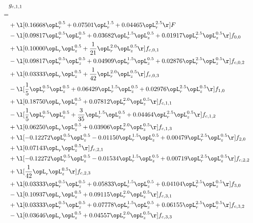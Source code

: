 \begin{alignat}{2} 
\label{eq:g_11_0} 
& g_{c,1,1} \nonumber \\ 
 = \\ 
& + \l[  0.16668 \opL_r^{0.5} +  0.07501 \opL_r^{1.5} +  0.04465 \opL_r^{2.5}  \r] F \nonumber \\ 
& - \l[  0.09817 \opL_r^{0.5} \opL_z^{0.5} +  0.03682 \opL_r^{1.5} \opL_z^{0.5} +  0.01917 \opL_r^{2.5} \opL_z^{0.5}  \r] f_{0,0} \nonumber \\ 
& + \l[  0.10000 \opL_r \opL_z^{0.5} + \frac{1}{21} \opL_r^{2.0} \opL_z^{0.5}  \r] f_{c,0,1} \nonumber \\ 
& - \l[  0.09817 \opL_r^{0.5} \opL_z^{0.5} +  0.04909 \opL_r^{1.5} \opL_z^{0.5} +  0.02876 \opL_r^{2.5} \opL_z^{0.5}  \r] f_{c,0,2} \nonumber \\ 
& + \l[  0.03333 \opL_r \opL_z^{0.5} + \frac{1}{42} \opL_r^{2.0} \opL_z^{0.5}  \r] f_{c,0,3} \nonumber \\ 
& - \l[ \frac{1}{5} \opL_r^{0.5} \opL_z^{0.5} +  0.06429 \opL_r^{1.5} \opL_z^{0.5} +  0.02976 \opL_r^{2.5} \opL_z^{0.5}  \r] f_{1,0} \nonumber \\ 
& + \l[  0.18750 \opL_r \opL_z^{0.5} +  0.07812 \opL_r^{2.0} \opL_z^{0.5}  \r] f_{c,1,1} \nonumber \\ 
& - \l[ \frac{1}{5} \opL_r^{0.5} \opL_z^{0.5} + \frac{3}{35} \opL_r^{1.5} \opL_z^{0.5} +  0.04464 \opL_r^{2.5} \opL_z^{0.5}  \r] f_{c,1,2} \nonumber \\ 
& + \l[  0.06250 \opL_r \opL_z^{0.5} +  0.03906 \opL_r^{2.0} \opL_z^{0.5}  \r] f_{c,1,3} \nonumber \\ 
& + \l[  -0.12272 \opL_r^{0.5} \opL_z^{0.5}   -0.01150 \opL_r^{1.5} \opL_z^{0.5} +  0.00479 \opL_r^{2.5} \opL_z^{0.5}  \r] f_{2,0} \nonumber \\ 
& + \l[  0.07143 \opL_r \opL_z^{0.5}  \r] f_{c,2,1} \nonumber \\ 
& + \l[  -0.12272 \opL_r^{0.5} \opL_z^{0.5}   -0.01534 \opL_r^{1.5} \opL_z^{0.5} +  0.00719 \opL_r^{2.5} \opL_z^{0.5}  \r] f_{c,2,2} \nonumber \\ 
& + \l[ \frac{1}{42} \opL_r \opL_z^{0.5}  \r] f_{c,2,3} \nonumber \\ 
& + \l[  0.03333 \opL_r^{0.5} \opL_z^{0.5} +  0.05833 \opL_r^{1.5} \opL_z^{0.5} +  0.04104 \opL_r^{2.5} \opL_z^{0.5}  \r] f_{3,0} \nonumber \\ 
& - \l[  0.10937 \opL_r \opL_z^{0.5} +  0.09115 \opL_r^{2.0} \opL_z^{0.5}  \r] f_{c,3,1} \nonumber \\ 
& + \l[  0.03333 \opL_r^{0.5} \opL_z^{0.5} +  0.07778 \opL_r^{1.5} \opL_z^{0.5} +  0.06155 \opL_r^{2.5} \opL_z^{0.5}  \r] f_{c,3,2} \nonumber \\ 
& - \l[  0.03646 \opL_r \opL_z^{0.5} +  0.04557 \opL_r^{2.0} \opL_z^{0.5}  \r] f_{c,3,3} \nonumber \\ 
\end{alignat} 


